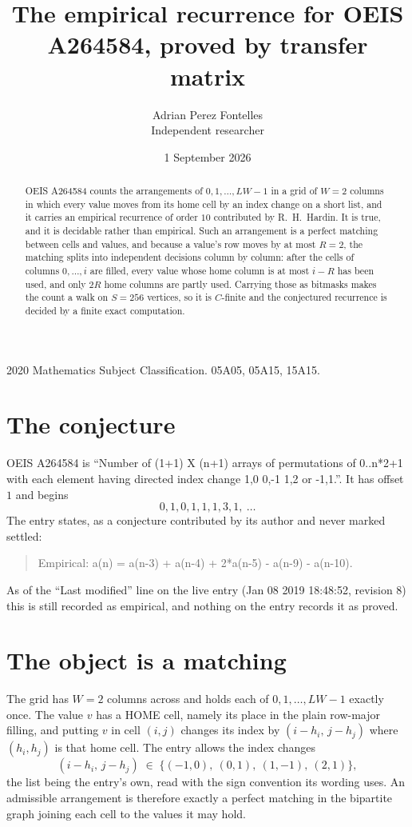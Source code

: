 \documentclass[11pt,a4paper]{article}
\title{The empirical recurrence for OEIS A264584, proved by transfer matrix}
\author{Adrian Perez Fontelles\\ \small Independent researcher}
\date{1 September 2026}
\theoremstyle{plain}
\theoremstyle{definition}
\begin{document}
\maketitle

\begin{abstract}
OEIS A264584 counts the arrangements of $0,1,\dots,LW-1$ in a grid of $W=2$ columns in which
every value moves from its home cell by an index change on a short list, and it carries an
empirical recurrence of order $10$ contributed by R.~H.~Hardin. It is true, and it is
decidable rather than empirical. Such an arrangement is a perfect matching between cells and
values, and because a value's row moves by at most $R=2$, the matching splits into
independent decisions column by column: after the cells of columns $0,\dots,i$ are filled,
every value whose home column is at most $i-R$ has been used, and only $2R$ home columns are
partly used. Carrying those as bitmasks makes the count a walk on $S=256$ vertices, so it is
$C$-finite and the conjectured recurrence is decided by a finite exact computation.
\end{abstract}

\noindent\small 2020 Mathematics Subject Classification. 05A05, 05A15, 15A15.\normalsize

\section{The conjecture}

OEIS A264584 is ``Number of (1+1) X (n+1) arrays of permutations of 0..n*2+1 with each element having directed index change 1,0 0,-1 1,2 or -1,1.''. It has offset $1$ and begins
\[
0, 1, 0, 1, 1, 1, 3, 1,\ \dots
\]
The entry states, as a conjecture contributed by its author and never marked settled:
\begin{quote}
Empirical: a(n) = a(n-3) + a(n-4) + 2*a(n-5) - a(n-9) - a(n-10).
\end{quote}
As of the ``Last modified'' line on the live entry (Jan 08 2019 18:48:52, revision 8) this is still
recorded as empirical, and nothing on the entry records it as proved.

\section{The object is a matching}

The grid has $W=2$ columns across and holds each of $0,1,\dots,LW-1$ exactly once. The value
$v$ has a HOME cell, namely its place in the plain row-major filling, and putting $v$ in cell
$(i,j)$ changes its index by $(i-h_i,\,j-h_j)$ where $(h_i,h_j)$ is that home cell. The entry
allows the index changes
\[
(i-h_i,\,j-h_j)\;\in\;\{(-1,0),\ (0,1),\ (1,-1),\ (2,1)\},
\]
the list being the entry's own, read with the sign convention its wording uses. An admissible
arrangement is therefore exactly a perfect matching in the bipartite graph joining each cell to
the values it may hold.
\end{document}
